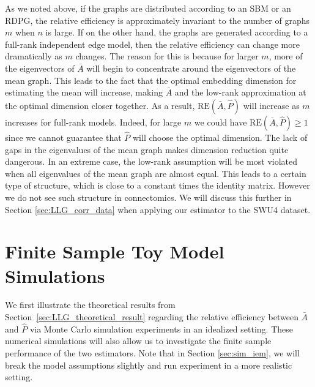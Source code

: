 \begin{remark}
\label{remark:low_rank}
As we noted above, if the graphs are distributed according to an SBM or an RDPG, the relative efficiency is approximately invariant to the number of graphs $m$ when $n$ is large.
If on the other hand, the graphs are generated according to a full-rank independent edge model, then the relative efficiency can change more dramatically as $m$ changes. 
The reason for this is because for larger $m$, more of the eigenvectors of $\bar{A}$ will begin to concentrate around the eigenvectors of the mean graph.
This leads to the fact that the optimal embedding dimension for estimating the mean will increase, making $\bar{A}$ and the low-rank approximation at the optimal dimension closer together. 
As a result, $\mathrm{RE}(\bar{A},\hat{P})$ will increase as $m$ increases for full-rank models.
Indeed, for large $m$ we could have $\mathrm{RE}(\bar{A},\hat{P})\geq 1$ since we cannot guarantee that $\hat{P}$ will choose the optimal dimension.
The lack of gaps in the eigenvalues of the mean graph makes dimension reduction quite dangerous.
In an extreme case, the low-rank assumption will be most violated when all eigenvalues of the mean graph are almost equal. This leads to a certain type of structure, which is close to a constant times the identity matrix. However we do not see such structure in connectomics.
We will discuss this further in Section \ref{sec:LLG_corr_data} when applying our estimator to the SWU4 dataset.
\end{remark}






\section{Finite Sample Toy Model Simulations}
\label{sec:sbm_sim}

We first illustrate the theoretical results from Section~\ref{sec:LLG_theoretical_result} regarding the relative efficiency between $\bar{A}$ and $\hat{P}$ via Monte Carlo simulation experiments in an idealized setting.
These numerical simulations will also allow us to investigate the finite sample performance of the two estimators.
Note that in Section \ref{sec:sim_iem}, we will break the model assumptions slightly and run experiment in a more realistic setting.

